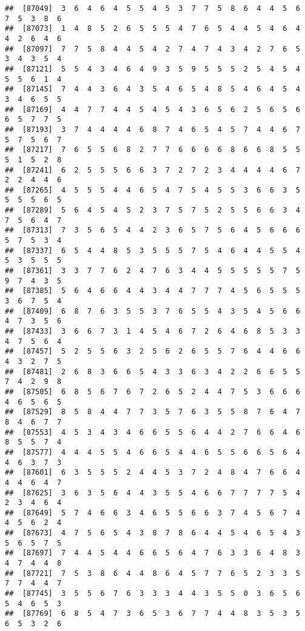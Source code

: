 \documentclass[
]{book}
\begin{document}
\begin{verbatim}
##  [87049]  3  6  4  6  4  5  5  4  5  3  7  7  5  8  6  4  4  5  6  7  5  3  8  6
##  [87073]  1  4  8  5  2  6  5  5  5  4  7  6  5  4  4  5  4  6  4  4  2  6  4  6
##  [87097]  7  7  5  8  4  4  5  4  2  7  4  7  4  3  4  2  7  6  5  3  4  3  5  4
##  [87121]  5  5  4  3  4  6  4  9  3  5  9  5  5  5  2  5  4  5  4  5  5  6  1  4
##  [87145]  7  4  4  3  6  4  3  5  4  6  5  4  8  5  4  6  4  5  4  3  4  6  5  5
##  [87169]  4  4  7  7  4  4  5  4  5  4  3  6  5  6  2  5  6  5  6  6  5  7  7  5
##  [87193]  3  7  4  4  4  4  6  8  7  4  6  5  4  5  7  4  4  6  7  5  7  5  6  7
##  [87217]  7  6  5  5  6  8  2  7  7  6  6  6  6  8  6  6  8  5  5  5  1  5  2  8
##  [87241]  6  2  5  5  5  6  6  3  7  2  7  2  3  4  4  4  4  6  7  2  2  4  4  6
##  [87265]  4  5  5  5  4  4  6  5  4  7  5  4  5  5  3  6  6  3  5  5  5  5  6  5
##  [87289]  5  6  4  5  4  5  2  3  7  5  7  5  2  5  5  6  6  3  4  7  5  6  4  7
##  [87313]  7  3  5  6  5  4  4  2  3  6  5  7  5  6  4  5  6  6  6  5  7  5  3  4
##  [87337]  6  5  4  4  8  5  3  5  5  5  7  5  4  6  4  4  5  5  4  5  3  5  5  5
##  [87361]  3  3  7  7  6  2  4  7  6  3  4  4  5  5  5  5  5  7  5  9  7  4  3  5
##  [87385]  5  6  4  6  6  4  4  3  4  4  7  7  7  4  5  6  5  5  5  3  6  7  5  4
##  [87409]  6  8  7  6  3  5  5  3  7  6  5  5  4  3  5  4  5  6  6  4  7  3  5  6
##  [87433]  3  6  6  7  3  1  4  5  4  6  7  2  6  4  6  8  5  3  3  4  7  5  6  4
##  [87457]  5  2  5  5  6  3  2  5  6  2  6  5  5  7  6  4  4  6  6  4  3  2  7  5
##  [87481]  2  6  8  3  6  6  5  4  3  3  6  3  4  2  2  6  6  5  5  7  4  2  9  8
##  [87505]  6  8  5  6  7  6  7  2  6  5  2  4  4  7  5  3  6  6  6  4  6  5  6  5
##  [87529]  8  5  8  4  4  7  7  3  5  7  6  3  5  5  8  7  6  4  7  8  4  6  7  7
##  [87553]  4  5  3  4  3  4  6  6  5  5  6  4  4  2  7  6  6  4  6  8  5  5  7  4
##  [87577]  4  4  4  5  5  4  6  6  5  4  4  6  5  5  6  6  5  6  4  4  6  3  7  3
##  [87601]  6  3  5  5  5  2  4  4  5  3  7  2  4  8  4  7  6  6  4  4  4  6  4  7
##  [87625]  3  6  3  5  6  4  4  3  5  5  4  6  6  7  7  7  7  5  4  2  3  4  6  4
##  [87649]  5  7  4  6  6  3  4  6  5  5  6  6  3  7  4  5  6  7  4  4  5  6  2  4
##  [87673]  4  7  5  6  5  4  3  8  7  8  6  4  4  5  4  6  5  4  3  5  6  5  7  5
##  [87697]  7  4  4  5  4  4  6  6  5  6  4  7  6  3  3  6  4  8  3  4  7  4  4  8
##  [87721]  7  5  3  8  6  4  4  8  6  4  5  7  7  6  5  2  3  3  5  7  7  4  4  7
##  [87745]  3  5  5  6  7  6  3  3  3  4  4  3  5  5  0  3  6  5  6  5  4  6  5  3
##  [87769]  6  8  5  4  7  3  6  5  3  6  7  7  4  4  8  3  5  3  5  6  5  3  2  6

\end{verbatim}
\end{document}

